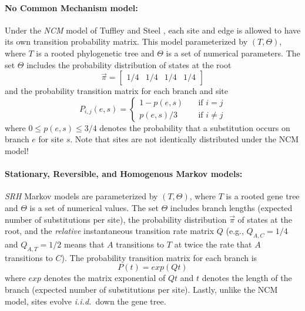 \paragraph{No Common Mechanism model:}
Under the \textit{\gls{NCM}} model of Tuffley and Steel \cite{tuffley1997links}, each site and edge is allowed to have its own transition probability matrix. 
This model parameterized by $(T, \Theta)$, where $T$ is a rooted phylogenetic tree and $\Theta$ is a set of numerical parameters.
The set $\Theta$ includes the probability distribution of states at the root
\begin{equation}
	\vec{\pi} = 
	\begin{bmatrix}
		1/4 & 1/4 & 1/4 & 1/4
	\end{bmatrix}
\end{equation}
and the probability transition matrix for each branch and site
\begin{equation}
P_{i,j}(e,s) =
\begin{cases}
    1 - p(e,s) & \quad \text{if $i=j$}\\
    p(e,s) / 3  & \quad \text{if $i \ne j$}
  \end{cases}
\end{equation}
where $0 \le p(e,s) \le 3/4$ denotes the probability that a substitution occurs on branch $e$ for site $s$.
Note that sites are not identically distributed under the NCM model!

\paragraph{Stationary, Reversible, and Homogenous Markov models:}
\textit{\Gls{SRH}} Markov models are parameterized by $(T, \Theta)$, where $T$ is a \gls{rooted} gene tree and $\Theta$ is a set of numerical values.
The set $\Theta$ includes branch lengths (expected number of substitutions per site), the probability distribution $\vec{\pi}$ of states at the root, and the {\em relative} instantaneous transition rate matrix $Q$ (e.g., $Q_{A,C} = 1/4$ and $Q_{A,T} = 1/2$ means that $A$ transitions to $T$ at twice the rate that $A$ transitions to $C$).
The probability transition matrix for each branch is 
\begin{equation}
	P(t) = exp(Q t)
\end{equation}
where $exp$ denotes the matrix exponential of $Qt$ and $t$ denotes the length of the branch (expected number of substitutions per site).
Lastly, unlike the NCM model, sites evolve {\em i.i.d.}~down the gene tree.

